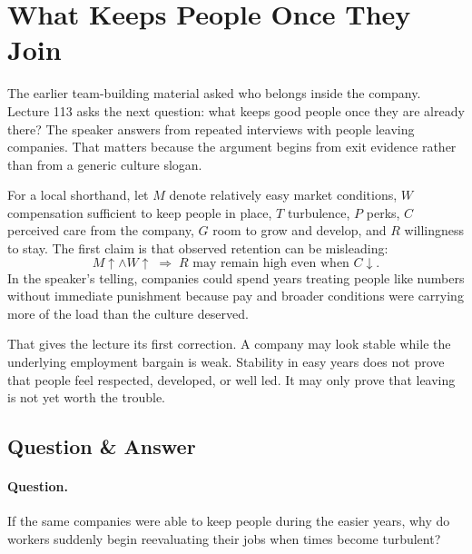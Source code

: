 \documentclass[11pt,oneside]{book}
\begin{document}

\section{What Keeps People Once They Join}

The earlier team-building material asked who belongs inside the company. Lecture 113 asks the next question: what keeps good people once they are already there? The speaker answers from repeated interviews with people leaving companies. That matters because the argument begins from exit evidence rather than from a generic culture slogan.

For a local shorthand, let \(M\) denote relatively easy market conditions, \(W\) compensation sufficient to keep people in place, \(T\) turbulence, \(P\) perks, \(C\) perceived care from the company, \(G\) room to grow and develop, and \(R\) willingness to stay. The first claim is that observed retention can be misleading:
\[
M \uparrow \land W \uparrow \;\Rightarrow\; R \text{ may remain high even when } C \downarrow .
\]
In the speaker's telling, companies could spend years treating people like numbers without immediate punishment because pay and broader conditions were carrying more of the load than the culture deserved.

That gives the lecture its first correction. A company may look stable while the underlying employment bargain is weak. Stability in easy years does not prove that people feel respected, developed, or well led. It may only prove that leaving is not yet worth the trouble.

\subsection{Question \& Answer}

\paragraph{Question.}
If the same companies were able to keep people during the easier years, why do workers suddenly begin reevaluating their jobs when times become turbulent?
\end{document}
